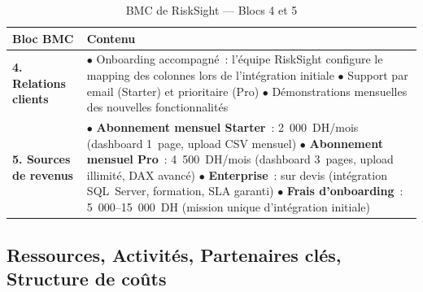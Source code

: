 \documentclass[12pt, a4paper]{report}
\begin{document}
\begin{table}[H]
\centering
\caption{BMC de RiskSight --- Blocs 4 et 5}
\label{tab:bmc_45}
\renewcommand{\arraystretch}{1.5}
\begin{tabularx}{\textwidth}{p{3cm} X}
\toprule
\rowcolor{primary!12}
Bloc BMC & Contenu \\
\midrule
\textbf{4. Relations clients} &
  $\bullet$ Onboarding accompagné~: l'équipe RiskSight configure le mapping des colonnes lors de l'intégration initiale \newline
  $\bullet$ Support par email (Starter) et prioritaire (Pro) \newline
  $\bullet$ Démonstrations mensuelles des nouvelles fonctionnalités \\
\midrule
\textbf{5. Sources de revenus} &
  $\bullet$ \textbf{Abonnement mensuel Starter}~: 2~000~DH/mois (dashboard 1~page, upload CSV mensuel) \newline
  $\bullet$ \textbf{Abonnement mensuel Pro}~: 4~500~DH/mois (dashboard 3~pages, upload illimité, DAX avancé) \newline
  $\bullet$ \textbf{Enterprise}~: sur devis (intégration SQL~Server, formation, SLA garanti) \newline
  $\bullet$ \textbf{Frais d'onboarding}~: 5~000--15~000~DH (mission unique d'intégration initiale) \\
\bottomrule
\end{tabularx}
\end{table}

\subsection{Ressources, Activités, Partenaires clés, Structure de coûts}
\end{document}
